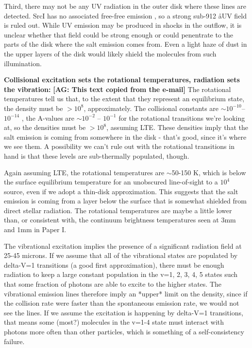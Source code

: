 \documentclass[twocolumn]{aastex62}
\newcommand{\sourcei}{SrcI\xspace}
\newcommand{\ag}[1]{\textcolor{red!65!black}{\textbf{[AG: #1]}}}
\begin{document}
Third, there may not be any UV radiation in the outer disk where these lines
are detected.  \sourcei has no associated free-free emission
\citep{Plambeck2013a}, so a strong sub-912 \aa UV field is ruled out.  While UV
emission may be produced in shocks in the outflow, it is unclear whether that
field could be strong enough or could penentrate to the parts of the disk where
the salt emission comes from.  Even a light haze of dust in the upper layers of
the disk would likely shield the molecules from such illumination.

\par{\textbf{Collisional excitation sets the rotational temperatures, radiation sets the vibration:}}
\ag{This text copied from the e-mail}
The rotational temperatures tell us that, to the extent that they represent an
equilibrium state, the density must be $>10^8$, approximately.  The collisional
constants are $\sim10^{-10}$--$10^{-14}$ \percc \pers, the A-values are $\sim10^{-2}$ -- $10^{-1}$ for the
rotational transitions we're looking at, so the densities must be $>10^8$,
assuming LTE.  These densities imply that the salt emission is coming from
somewhere in the disk - that's good, since it's where we see them.  A
possibility we can't rule out with the rotational transitions in hand is that
these levels are sub-thermally populated, though.

Again assuming LTE, the rotational temperatures are $\sim$50-150 K, which is below
the surface equilibrium temperature for an unobscured line-of-sight to a $10^4$
\lsun source, even if we adopt a thin-disk approximation.  This suggests that
the salt emission is coming from a layer below the surface that is somewhat
shielded from direct stellar radiation.  The rotational temperatures are maybe
a little lower than, or consistent with, the continuum brightness temperatures
seen at 3mm and 1mm in Paper I.

The vibrational excitation implies the presence of a significant radiation
field at 25-45 microns.  If we assume that all of the vibrational states are
populated by delta-V=1 transitions (a good first approximation), there must be
enough radiation to keep a large constant population in the v=1, 2, 3, 4, 5
states such that some fraction of photons are able to excite to the higher
states.   The vibrational emission lines therefore imply an *upper* limit on
the density, since if the collision rate were faster than the spontaneous
emission rate, we would not see the lines.  If we assume the excitation is
happening by delta-V=1 transitions, that means some (most?) molecules in the
v=1-4 state must interact with photons more often than other particles, which
is something of a self-consistency failure.
\end{document}
